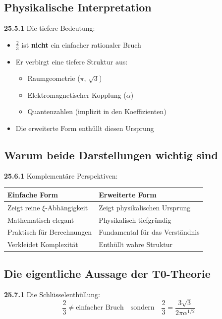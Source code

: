 \subsection{Physikalische Interpretation}

\noindent \textbf{25.5.1} Die tiefere Bedeutung:
\begin{itemize}
	\item $\frac{2}{3}$ ist \textbf{nicht} ein einfacher rationaler Bruch
	\item Er verbirgt eine tiefere Struktur aus:
	\begin{itemize}
		\item Raumgeometrie ($\pi$, $\sqrt{3}$)
		\item Elektromagnetischer Kopplung ($\alpha$)
		\item Quantenzahlen (implizit in den Koeffizienten)
	\end{itemize}
	\item Die erweiterte Form enthüllt diesen Ursprung
\end{itemize}

\subsection{Warum beide Darstellungen wichtig sind}

\noindent \textbf{25.6.1} Komplementäre Perspektiven:

\begin{tabular}{p{}p{}}
	\textbf{Einfache Form} & \textbf{Erweiterte Form} \\
	\hline
	Zeigt reine $\xi$-Abhängigkeit & Zeigt physikalischen Ursprung \\
	Mathematisch elegant & Physikalisch tiefgründig \\
	Praktisch für Berechnungen & Fundamental für das Verständnis \\
	Verkleidet Komplexität & Enthüllt wahre Struktur \\
\end{tabular}

\subsection{Die eigentliche Aussage der T0-Theorie}

\noindent \textbf{25.7.1} Die Schlüsselenthüllung:
\[
\boxed{
	\frac{2}{3} \neq \text{einfacher Bruch} \quad \text{sondern} \quad \frac{2}{3} = \frac{3\sqrt{3}}{2\pi\alpha^{1/2}}
}
\]

